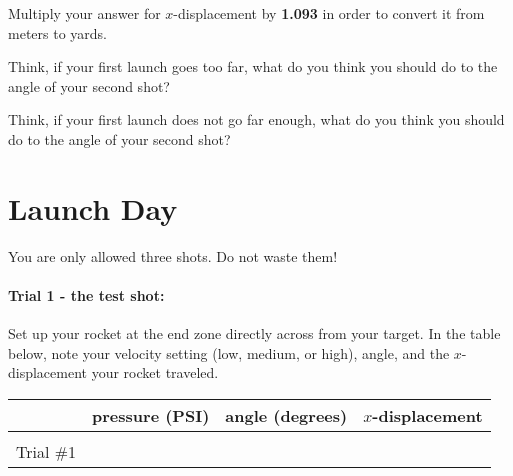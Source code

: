 \documentclass[10pt]{exam}
\begin{document}
\begin{questions}

    \vs

  \question \label{convert}
    Multiply your answer for $x$-displacement by \textbf{1.093} in order to convert it from meters to yards.
    \vspace{4em}

  \pagebreak

  \question \label{too-far}
    Think, if your first launch goes too far, what do you think you should do to the angle of your second shot?
    \vspace{4em}

  \question \label{too-short}
    Think, if your first launch does not go far enough, what do you think you should do to the angle of your second shot?
    \vspace{4em}


\end{questions}

\section*{Launch Day}

You are only allowed three shots.  Do not waste them!

\paragraph{Trial 1 - the test shot:}  Set up your rocket at the end zone directly across from your target.  In the table below, note your velocity setting (low, medium, or high), angle, and the $x$-displacement your rocket traveled.

\noindent
\begin{tabular}{|*4{l|}}
  \hline
  & pressure (PSI) & angle (degrees) & $x$-displacement\\\hline
  &&& \\
  Trial \#1 &&& \\
  \hline
\end{tabular}
\end{document}
